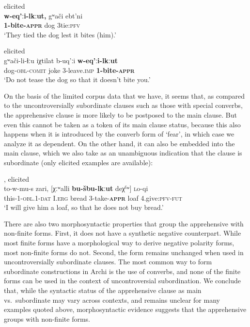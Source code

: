 \documentclass[output=paper,colorlinks,citecolor=brown]{langscibook}
\begin{document}
\ea \label{ex:DD30} \textnormal{elicited} \\
\gll \textbf{w-eq'ːi-lkːut,} gʷači   e{\textlangle}b{\textrangle}t'ni \\
\textbf{1-bite-\textsc{appr}} dog {\textlangle}3{\textrangle}tie:\textsc{pfv} \\
\glt `They tied the dog lest it bites (him).'
\z


\ea \label{ex:DD31} \textnormal{elicited} \\
\gll gʷači-li-ɬːu iχtilat b-uq'ːi \textbf{w-eq'ːi-lkːut} \\
dog-\textsc{obl-comit} joke 3-leave.\textsc{imp} \textbf{1-bite-\textsc{appr}} \\
\glt `Do not tease the dog so that it doesn't bite you.'
\z


On the basis of the limited corpus data that we have, it seems that, as compared to the uncontroversially subordinate clauses such as those with special converbs, the apprehensive clause is more likely to be postposed to the main clause. But even this cannot be taken as a token of its main clause status, because this also happens when it is introduced by the converb form of `fear', in which case we analyze it as dependent. On the other hand, it can also be embedded into the main clause, which we also take as an unambiguous indication that the clause is subordinate (only elicited examples are available):

\ea \label{ex:DD32} \textnormal{\citet[292]{Kibrik1977}, elicited} \\
\gll to-w-mu-s zari, \textup{[}χːʷalli \textbf{bu-šbu-lkːut} deχˁʷ\textup{]} \textsc{l}o-qi \\
this-1-\textsc{obl.1-dat} I.\textsc{erg} bread 3-take-\textbf{\textsc{appr}} loaf 4.give:\textsc{pfv-fut} \\
\glt `I will give him a loaf, so that he does not buy bread.' \\ 
\z

There are also two morphosyntactic properties that group the apprehensive with non-finite forms. First, it does not have a synthetic negative counterpart. While most finite forms have a morphological way to derive negative polarity forms, most non-finite forms do not. Second, the form remains unchanged when used in uncontroversially subordinate clauses. The most common way to form subordinate constructions in Archi is the use of converbs, and none of the finite forms can be used in the context of uncontroversial subordination. We conclude that, while the syntactic status of the apprehensive clause as main vs.\ subordinate may vary across contexts, and remains unclear for many examples quoted above, morphosyntactic evidence suggests that the apprehensive groups with non-finite forms. 
\end{document}
